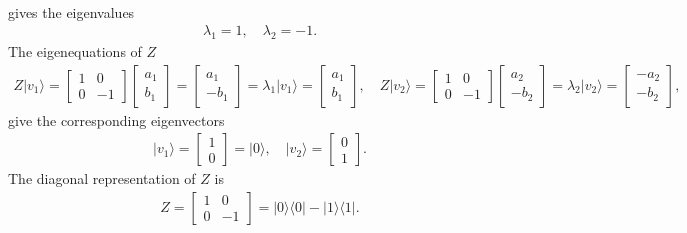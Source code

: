 \documentclass[en]{sol-man}
\begin{document}
\begin{sol}
\begin{align}
    \end{align}
    gives the eigenvalues
    \begin{align}
        \lambda_1=1,\quad\lambda_2=-1.
    \end{align}
    The eigenequations of $Z$
    \begin{align}
        Z\lvert v_1\rangle=\begin{bmatrix}
            1&0\\
            0&-1
        \end{bmatrix}\begin{bmatrix}
            a_1\\
            b_1
        \end{bmatrix}=\begin{bmatrix}
            a_1\\
            -b_1
        \end{bmatrix}=\lambda_1\lvert v_1\rangle=\begin{bmatrix}
            a_1\\
            b_1
        \end{bmatrix},\quad Z\lvert v_2\rangle=\begin{bmatrix}
            1&0\\
            0&-1
        \end{bmatrix}\begin{bmatrix}
            a_2\\
            -b_2
        \end{bmatrix}=\lambda_2\lvert v_2\rangle=\begin{bmatrix}
            -a_2\\
            -b_2
        \end{bmatrix},
    \end{align}
    give the corresponding eigenvectors
    \begin{align}
        \lvert v_1\rangle=\begin{bmatrix}
            1\\
            0
        \end{bmatrix}=\lvert 0\rangle,\quad\lvert v_2\rangle=\begin{bmatrix}
            0\\
            1
        \end{bmatrix}.
    \end{align}
    The diagonal representation of $Z$ is
    \begin{align}
        Z=\begin{bmatrix}
            1&0\\
            0&-1
        \end{bmatrix}=\lvert 0\rangle\langle 0\rvert-\lvert 1\rangle\langle 1\rvert.
    \end{align}
\end{sol}
\end{document}
